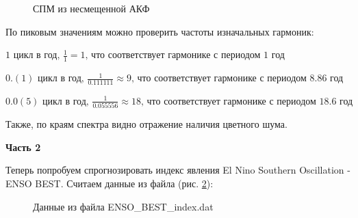 \documentclass[a4paper,oneside,14pt]{extreport}
\begin{document}
\newpage
\begin{figure}[!h]
\caption{СПМ из несмещенной АКФ}
\label{task1_psd_unbiased}
\end{figure}

\noindent По пиковым значениям можно проверить частоты изначальных гармоник: 

\noindent $1 \text{ цикл в год, } \frac{1}{1} = 1 \text{, что соответствует гармонике с периодом 1 год}$

\noindent $0.(1) \text{ цикл в год, } \frac{1}{0.111111} \approx 9\text{, что соответствует гармонике с периодом 8.86 год}$

\noindent $0.0(5) \text{ цикл в год, } \frac{1}{0.055556} \approx 18\text{, что соответствует гармонике с периодом 18.6 год}$

\noindent Также, по краям спектра видно отражение наличия цветного шума.

\newpage
\textbf{Часть 2}

Теперь попробуем спрогнозировать индекс явления El Nino Southern Oscillation - ENSO BEST. Считаем данные из файла (рис. \ref{task2_data}):
\begin{figure}[!h]
	\caption{Данные из файла ENSO\_BEST\_index.dat}
	\label{task2_data}
\end{figure}
\end{document}
